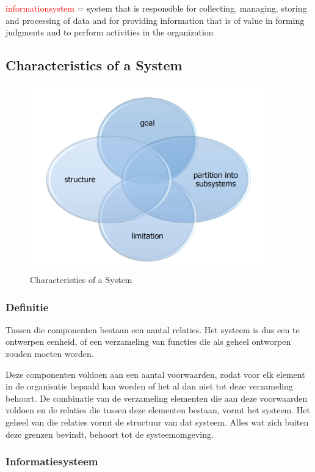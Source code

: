 \textcolor{red}{\Gls{informationsystem}} = system that is responsible for collecting, managing, storing and processing of data and for providing information that is of value in forming judgments and to perform activities in the organization


\subsection{Characteristics of a System}

\begin{figure}[htp]
    \centering
            \includegraphics[width=4in]{img/osa1.PNG}
        \caption{Characteristics of a System}
    \label{fig:Characteristics of a System}
\end{figure}




\subsubsection{Definitie}

Tussen die componenten bestaan een aantal relaties. Het systeem is dus een te ontwerpen eenheid, of een verzameling van functies die als geheel ontworpen zouden moeten worden.

Deze componenten voldoen aan een aantal voorwaarden, zodat voor elk element in de organisatie bepaald kan worden of het al dan niet tot deze verzameling behoort. De combinatie van de verzameling elementen die aan deze voorwaarden voldoen en de relaties die tussen deze elementen bestaan, vormt het systeem. Het geheel van die relaties vormt de structuur van dat systeem. Alles wat zich buiten deze grenzen bevindt, behoort tot de systeemomgeving.

\subsubsection{Informatiesysteem}

